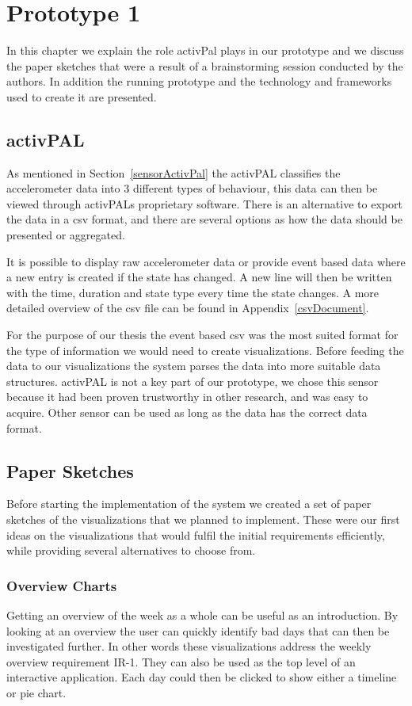 \chapter{Prototype 1}
\label{ch:prototype1}
In this chapter we explain the role activPal plays in our prototype and we discuss the paper sketches that were a result of a brainstorming session conducted by the authors. In addition the running prototype and the technology and frameworks used to create it are presented.

\section{activPAL}
As mentioned in Section~\ref{sensorActivPal} the activPAL classifies the accelerometer data into 3 different types of behaviour, this data can then be viewed through activPALs proprietary software. There is an alternative to export the data in a \gls{csv} format, and there are several options as how the data should be presented or aggregated. 

It is possible to display raw accelerometer data or provide event based data where a new entry is created if the state has changed. A new line will then be written with the time, duration and state type every time the state changes. A more detailed overview of the \gls{csv} file can be found in Appendix~\ref{csvDocument}.

For the purpose of our thesis the event based \gls{csv} was the most suited format for the type of information we would need to create visualizations. Before feeding the data to our visualizations the system parses the data into more suitable data structures. activPAL is not a key part of our prototype, we chose this sensor because it had been proven trustworthy in other research, and was easy to acquire. Other sensor can be used as long as the data has the correct data format.

\clearpage

\section{Paper Sketches}
\label{sec:paperSketches}
Before starting the implementation of the system we created a set of paper sketches of the visualizations that we planned to implement. These were our first ideas on the visualizations that would fulfil the initial requirements efficiently, while providing several alternatives to choose from.

\subsection{Overview Charts}
Getting an overview of the week as a whole can be useful as an introduction. By looking at an overview the user can quickly identify bad days that can then be investigated further. In other words these visualizations address the weekly overview requirement IR-1. They can also be used as the top level of an interactive application. Each day could then be clicked to show either a timeline or pie chart.

